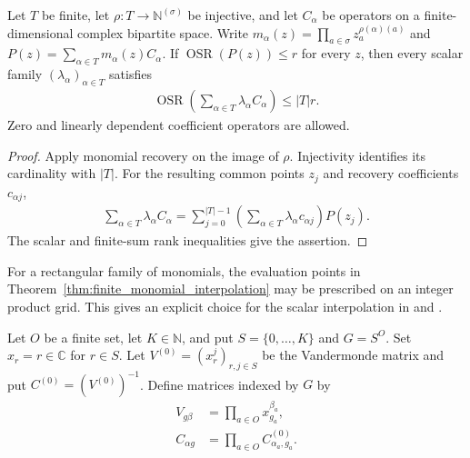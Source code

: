 \begin{theorem}
    \label{thm:monomial_evaluation_weighted_rank}
    \leanok
    Let $T$ be finite, let $\rho:T\to\mathbb N^{(\sigma)}$ be injective, and let
    $C_\alpha$ be operators on a finite-dimensional complex bipartite space.
    Write $m_\alpha(z)=\prod_{a\in\sigma}z_a^{\rho(\alpha)(a)}$ and
    $P(z)=\sum_{\alpha\in T}m_\alpha(z)C_\alpha$.
    If $\operatorname{OSR}(P(z))\le r$ for every $z$, then every scalar family
    $(\lambda_\alpha)_{\alpha\in T}$ satisfies
    \begin{align*}
        \operatorname{OSR}\!\left(\sum_{\alpha\in T}\lambda_\alpha C_\alpha\right)
        \le |T|r.
    \end{align*}
    Zero and linearly dependent coefficient operators are allowed.
\end{theorem}
\begin{proof}
    \leanok
    Apply monomial recovery on the image of $\rho$. Injectivity identifies its
    cardinality with $|T|$. For the resulting common points $z_j$ and recovery
    coefficients $c_{\alpha j}$,
    \begin{align*}
        \sum_{\alpha\in T}\lambda_\alpha C_\alpha
        =\sum_{j=0}^{|T|-1}\left(\sum_{\alpha\in T}
        \lambda_\alpha c_{\alpha j}\right)P(z_j).
    \end{align*}
    The scalar and finite-sum rank inequalities give the assertion.
\end{proof}

For a rectangular family of monomials, the evaluation points in
Theorem~\ref{thm:finite_monomial_interpolation} may be prescribed on an integer
product grid. This gives an explicit choice for the scalar interpolation in
\cite[Lemma~4.2]{Arad2013AreaLaw} and
\cite[Proposition~5.7]{Arad2016RigorousRG}.

\begin{definition}
    \label{def:integer_grid_matrices}
    \leanok
    Let $O$ be a finite set, let $K\in\mathbb N$, and put
    $S=\{0,\ldots,K\}$ and $G=S^O$. Set $x_r=r\in\mathbb C$ for $r\in S$.
    Let $V^{(0)}=(x_r^j)_{r,j\in S}$ be the Vandermonde matrix and put
    $C^{(0)}=(V^{(0)})^{-1}$. Define matrices indexed by $G$ by
    \begin{align*}
        V_{g\beta}   & =\prod_{a\in O}x_{g_a}^{\beta_a},      \\
        C_{\alpha g} & =\prod_{a\in O}C^{(0)}_{\alpha_a,g_a}.
    \end{align*}
\end{definition}

